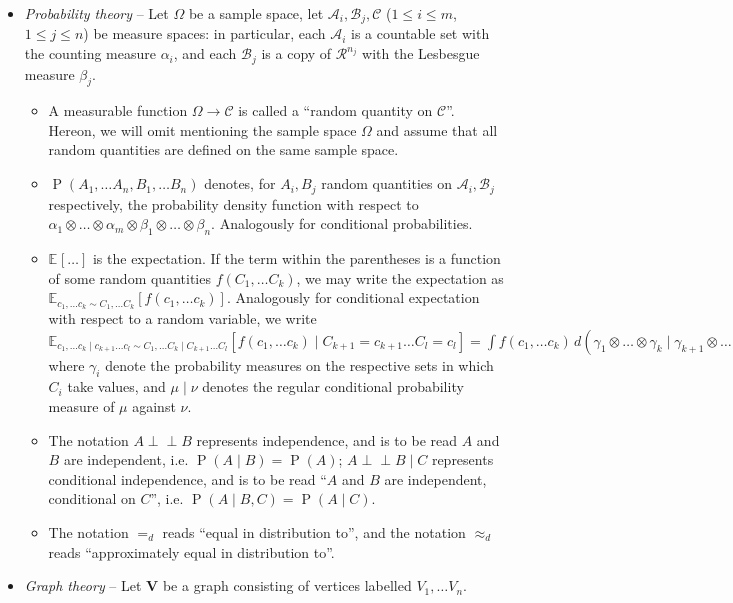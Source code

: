 \documentclass[12pt]{article}
\newcommand{\ci}{\perp\!\!\!\perp}
\newcommand{\E}[2][{}]{\mathbb{E}_{#1}\left[#2\right]}
\newcommand{\Prob}[1]{\operatorname{P}\left(#1\right)}
\theoremstyle{definition}
\numberwithin{equation}{section}
\numberwithin{figure}{section}
\numberwithin{table}{section}
\begin{document}
\begin{itemize}
    \item \emph{Probability theory} -- Let $\Omega$ be a sample space, let $\mathcal{A}_i,\mathcal{B}_j, \mathcal{C}$ ($1\le i\le m$, $1\le j\le n$) be measure spaces: in particular, each $\mathcal{A}_i$ is a countable set with the counting measure $\alpha_i$, and each $\mathcal{B}_j$ is a copy of $\mathcal{R}^{n_j}$ with the Lesbesgue measure $\beta_j$.
    \begin{itemize}
        \item A measurable function $\Omega\to \mathcal{C}$ is called a ``random quantity on $\mathcal{C}$''. Hereon, we will omit mentioning the sample space $\Omega$ and assume that all random quantities are defined on the same sample space.
        \item $\Prob{A_1,\dots A_n, B_1, \dots B_n}$ denotes, for $A_i, B_j$ random quantities on $\mathcal{A}_i,\mathcal{B}_j$ respectively, the probability density function with respect to $\alpha_1\otimes\dots\otimes\alpha_m\otimes\beta_1\otimes\dots\otimes\beta_n$. Analogously for conditional probabilities.
        \item $\E{\dots}$ is the expectation. If the term within the parentheses is a function of some random quantities $f(C_1,\dots C_k)$, we may write the expectation as $\E[c_1,\dots c_k\sim C_1,\dots C_k]{f(c_1,\dots c_k)}$.  Analogously for conditional expectation with respect to a random variable, we write $\E[c_1,\dots c_k\mid c_{k+1}\dots c_l \sim C_1,\dots C_k\mid C_{k+1}\dots C_l]{f(c_1,\dots c_k)\mid C_{k+1}=c_{k+1}\dots C_l=c_l} = \int{f(c_1,\dots c_k)\,d(\gamma_1\otimes\dots\otimes\gamma_k\mid\gamma_{k+1}\otimes\dots\otimes\gamma_{k})}$ where $\gamma_i$ denote the probability measures on the respective sets in which $C_i$ take values, and $\mu\mid\nu$ denotes the regular conditional probability measure of $\mu$ against $\nu$.
        \item The notation $A\ci B$ represents independence, and is to be read $A$ and $B$ are independent, i.e. $\Prob{A\mid B}=\Prob{A}$; $A\ci B\mid C$ represents conditional independence, and is to be read ``$A$ and $B$ are independent, conditional on $C$'', i.e. $\Prob{A\mid B, C}=\Prob{A\mid C}$. 
        \item The notation $=_d$ reads ``equal in distribution to'', and the notation $\approx_d$ reads ``approximately equal in distribution to''.
    \end{itemize}
    \item \emph{Graph theory} -- Let $\mathbf{V}$ be a graph consisting of vertices labelled $V_1,\dots V_n$. 

\end{itemize}
\end{document}
